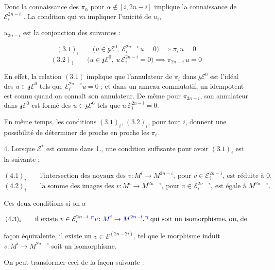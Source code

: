 \documentclass[11pt,a4paper]{article}
\begin{document}
Donc la connaissance des $\pi_{\alpha}$ pour $\alpha \notin [i, 2n-i]$ implique
la connaissance de $\mathcal{E}^{2n-i}_{i}$ . La condition qui
va impliquer l'unicité de $u_{i}$,


$u_{2n-i}$ est  la \struck{\ill{}} conjonction des suivantes :

\[ (3.1)_{i} \qquad \bigl( u \in \mathfrak{z}\mathcal{E}^{0}, \ \mathcal{E}^{2n-i}_{i}\, u = 0 \bigr) \implies \pi_{i}\, u = 0 \]
\[ (3.2)_{i} \qquad \bigl( u \in \mathfrak{z}\mathcal{E}^{0}, \ u\, \mathcal{E}^{2n-i}_{i} = 0 \bigr) \implies \pi_{2n-i}\, u = 0 \]

En effet, la relation $(3.1)$ implique que  l'annulateur de $\pi_{i}$ dans $\mathfrak{z}\mathcal{E}^{0}$ est l'idéal
des $u \in \mathfrak{z}\mathcal{E}^{0}$ tels que $\mathcal{E}^{2n-i}_{i} u = 0$ ;
et dans un anneau commutatif, un idempotent est connu quand on connaît son
annulateur. De même pour $\pi_{2n-i}$, son annulateur dans
$\mathfrak{z}\mathcal{E}^{0}$ est formé des $u \in \mathfrak{z}\mathcal{E}^{0}$
tels que $u\, \mathcal{E}^{2n-i}_{i} = 0$.

En même temps, les conditions $(3.1)_{i}$, $(3.2)_{i}$, pour tout $i$, donnent
une  possibilité de déterminer de proche en proche les
$\pi_{i}$.

4. Lorsque $\mathcal{E}^{*}$ est comme dans 1., une condition
suffisante pour avoir $(3.1)_{i}$  est la  suivante :

\[ (4.1)_{i} \qquad \text{l'intersection des noyaux des } v \colon M^{i} \to M^{2n-i}, \ \text{pour } v \in \mathcal{E}^{2n-i}_{i}, \ \text{est réduite à } 0 . \]
\[ (4.2)_{i} \qquad \text{la somme des images des } v \colon M^{i} \to M^{2n-i}, \ \text{pour } v \in \mathcal{E}^{2n-i}_{i}, \ \text{est égale à } M^{2n-i} . \]

Ces deux conditions  si on a

\[ (4.3)_{i} \qquad \text{il existe } v \in \mathcal{E}^{2n-i}_{i} \ \text{\add{$v \colon M^{i} \to M^{2n-i}$,} qui soit un isomorphisme, ou, de} \]


façon équivalente, il existe un $v \in \mathcal{E}^{(2n-2i)}$, tel que le morphisme
induit $v \colon M^{i} \to M^{2n-i}$ soit un isomorphisme.

On peut transformer ceci de la façon suivante :
\end{document}
